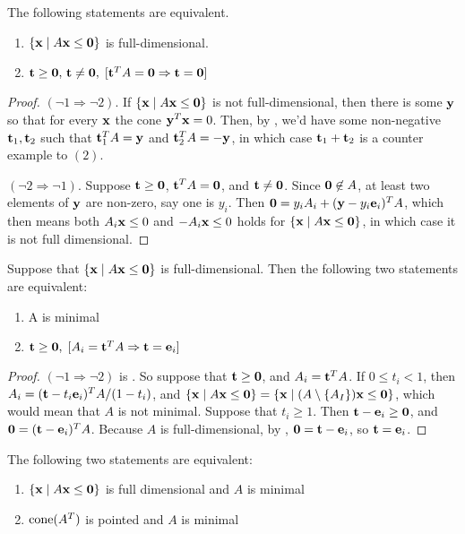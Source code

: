 \begin{Prop} \label{a_full_d}The following statements are equivalent.
	\begin{enumerate}
		\item $\left\{\mathbf{x}\;|\; A\mathbf{x}\leq\mathbf{0}\right\}$ is full-dimensional.
		\item $\mathbf{t}\geq\mathbf{0},\,\mathbf{t}\neq\mathbf{0},\; [\mathbf{t}^T A=\mathbf{0} \Rightarrow \mathbf{t}=\mathbf{0}]$
	\end{enumerate}
\end{Prop}

\begin{proof}
	$(\neg 1\Rightarrow \neg 2)$.  If $\left\{\mathbf{x}\;|\; A\mathbf{x}\leq\mathbf{0}\right\}$ is not full-dimensional, then there is some $\mathbf{y}$ so that for every $\mathbf{x}$ the cone $\mathbf{y}^T\mathbf{x}= 0$.  Then, by , we'd have some non-negative $\mathbf{t}_1,\mathbf{t}_2$ such that $\mathbf{t}_1^T A = \mathbf{y}$ and $\mathbf{t}_2^T A = -\mathbf{y}$, in which case $\mathbf{t}_1 + \mathbf{t}_2$ is a counter example to $(2)$.

	$(\neg 2\Rightarrow \neg 1)$.  Suppose $\mathbf{t}\geq\mathbf{0}$, $\mathbf{t}^T A =\mathbf{0}$, and $\mathbf{t}\neq\mathbf{0}$.  Since $\mathbf{0}\not\in A$, at least two elements of $\mathbf{y}$ are non-zero, say one is $y_i$.  Then $\mathbf{0} = y_i A_i + (\mathbf{y}-y_i\mathbf{e}_i)^T A$, which then means both $A_i\mathbf{x}\leq 0$ and $-A_i\mathbf{x}\leq 0$ holds for $\left\{\mathbf{x}\;|\; A\mathbf{x}\leq\mathbf{0}\right\}$, in which case it is not full dimensional.
\end{proof}

\begin{Prop}\label{min_hcone_generators}
	Suppose that $\left\{\mathbf{x}\;|\; A\mathbf{x}\leq\mathbf{0}\right\}$ is full-dimensional.  Then the following two statements are equivalent:
	\begin{enumerate}
		\item A is minimal
		\item $\mathbf{t}\geq\mathbf{0},\; [A_i=\mathbf{t}^T A \Rightarrow \mathbf{t}=\mathbf{e}_i]$
	\end{enumerate}
\end{Prop}

\begin{proof}
	$(\neg 1 \Rightarrow \neg 2)$ is .  So suppose that $\mathbf{t}\geq\mathbf{0}$, and $A_i=\mathbf{t}^T A$.  If $0\leq t_i < 1$, then $A_i = (\mathbf{t}-t_i\mathbf{e}_i)^T A/(1-t_i)$, and $\left\{\mathbf{x}\;|\; A\mathbf{x}\leq\mathbf{0}\right\}=\left\{\mathbf{x}\;|\; (A\setminus\left\{A_I\right\})\mathbf{x}\leq\mathbf{0}\right\}$, which would mean that $A$ is not minimal.  Suppose that $t_i\geq 1$.  Then $\mathbf{t}-\mathbf{e}_i\geq\mathbf{0}$, and $\mathbf{0}=(\mathbf{t}-\mathbf{e}_i)^TA$.  Because $A$ is full-dimensional, by , $\mathbf{0}=\mathbf{t}-\mathbf{e}_i$, so $\mathbf{t}=\mathbf{e}_i$.
\end{proof}

\begin{Prop}\label{min_hcones_vcones}
	The following two statements are equivalent:
	\begin{enumerate}
		\item $\left\{\mathbf{x}\;|\; A\mathbf{x}\leq\mathbf{0}\right\}$ is full dimensional and $A$ is minimal
		\item $\operatorname{cone}(A^T)$ is pointed and $A$ is minimal
	\end{enumerate}
\end{Prop}


